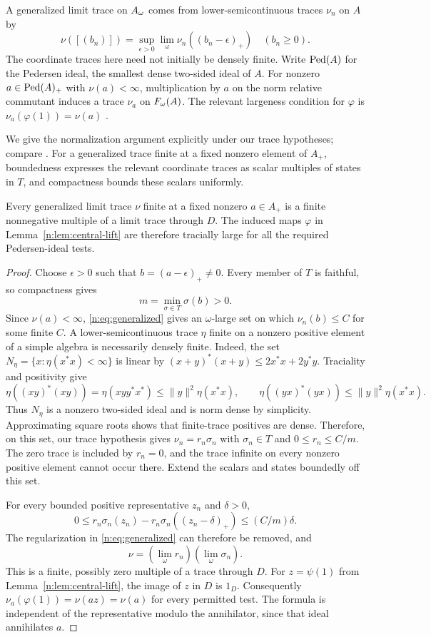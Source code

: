 A generalized limit trace on $A_\omega$ comes from lower-semicontinuous traces
$\nu_n$ on $A$ by
\begin{equation}\label{n:eq:generalized}
 \nu([(b_n)])=\sup_{\epsilon>0}\lim_\omega\nu_n((b_n-\epsilon)_+)
 \quad(b_n\ge0).
\end{equation}
The coordinate traces here need not initially be densely finite. Write
$\operatorname{Ped}(A)$ for the Pedersen ideal, the smallest dense two-sided ideal of
$A$. For
nonzero $a\in\operatorname{Ped}(A)_+$ with $\nu(a)<\infty$, multiplication by $a$
on the norm relative commutant induces a trace $\nu_a$ on $F_\omega(A)$.
The relevant largeness condition for $\varphi$ is
$\nu_a(\varphi(1))=\nu(a)$ \cite[Definition 2.4]{CLS}.

We give the normalization argument explicitly under our trace hypotheses;
compare \cite[Lemma 2.3 and the discussion after Definition 2.4]{CLS}.
For a generalized trace finite at a fixed nonzero element of $A_+$,
boundedness expresses the relevant coordinate traces as scalar multiples
of states in $T$, and compactness bounds these scalars uniformly.

\begin{lemma}\label{n:lem:generalized}
Every generalized limit trace $\nu$ finite at a fixed nonzero
$a\in A_+$ is a finite nonnegative multiple of a limit trace through $D$.
The induced maps $\varphi$ in Lemma~\ref{n:lem:central-lift} are therefore
tracially large
for all the required Pedersen-ideal tests.
\end{lemma}
\begin{proof}
Choose $\epsilon>0$ such that $b=(a-\epsilon)_+\ne0$. Every member of
$T$ is faithful, so compactness gives
\[
 m=\min_{\sigma\in T}\sigma(b)>0.
\]
Since $\nu(a)<\infty$, \eqref{n:eq:generalized} gives an $\omega$-large set
on which $\nu_n(b)\le C$ for some finite $C$. A lower-semicontinuous
trace $\eta$ finite on a nonzero positive element of a simple algebra is
necessarily densely finite. Indeed, the set
$N_\eta=\{x:\eta(x^*x)<\infty\}$ is linear by
$(x+y)^*(x+y)\le2x^*x+2y^*y$. Traciality and positivity give
\[
 \eta((xy)^*(xy))=\eta(xyy^*x^*)\le\|y\|^2\eta(x^*x),
 \qquad \eta((yx)^*(yx))\le\|y\|^2\eta(x^*x).
\]
Thus $N_\eta$ is a nonzero two-sided ideal and is norm dense by simplicity.
Approximating square roots shows that finite-trace positives are dense.
Therefore, on this set,
our trace hypothesis gives $\nu_n=r_n\sigma_n$ with $\sigma_n\in T$ and
$0\le r_n\le C/m$. The zero trace is included by $r_n=0$, and the trace
infinite on every nonzero positive element cannot occur there. Extend the
scalars and states boundedly off this set.

For every bounded positive representative $z_n$ and $\delta>0$,
\[
 0\le r_n\sigma_n(z_n)-r_n\sigma_n((z_n-\delta)_+)
       \le(C/m)\delta.
\]
The regularization in \eqref{n:eq:generalized} can therefore be removed,
and
\[
 \nu=(\lim_\omega r_n)(\lim_\omega\sigma_n).
\]
This is a finite, possibly zero multiple of a trace through $D$.
For $z=\psi(1)$ from Lemma~\ref{n:lem:central-lift}, the image of $z$ in
$D$ is $1_D$. Consequently
$\nu_a(\varphi(1))=\nu(az)=\nu(a)$ for every permitted test. The formula
is independent of the representative modulo the annihilator, since that
ideal annihilates $a$.
\end{proof}

